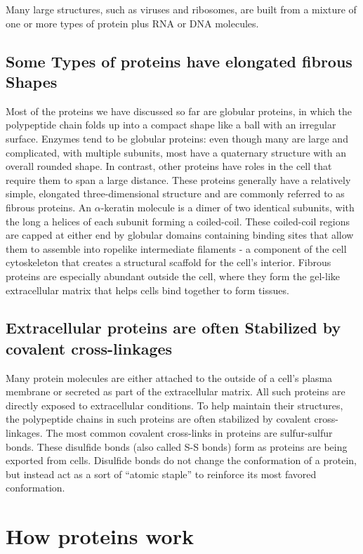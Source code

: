 Many large structures, such as viruses and ribosomes, are built from a
mixture of one or more types of protein plus RNA or DNA molecules.

\subsection{Some Types of proteins have elongated fibrous Shapes}

Most of the proteins we have discussed so far are globular proteins, in
which the polypeptide chain folds up into a compact shape like a ball
with an irregular surface. Enzymes tend to be globular proteins: even
though many are large and complicated, with multiple subunits, most
have a quaternary structure with an overall rounded shape.
In contrast, other proteins have roles in the cell that require them to
span a large distance. These proteins generally have a relatively simple,
elongated three-dimensional structure and are commonly referred to as
fibrous proteins.
An $\alpha$-keratin molecule is a dimer of two identical subunits, with the
long a helices of each subunit forming a coiled-coil.
These coiled-coil regions are capped at either end by globular domains
containing binding sites that allow them to assemble into ropelike intermediate
filaments - a component of the cell cytoskeleton that creates a
structural scaffold for the cell’s interior.
Fibrous proteins are especially abundant outside the cell, where they
form the gel-like extracellular matrix that helps cells bind together to form
tissues.

\subsection{Extracellular proteins are often Stabilized by covalent cross-linkages}

Many protein molecules are either attached to the outside of a cell’s
plasma membrane or secreted as part of the extracellular matrix. All such
proteins are directly exposed to extracellular conditions. To help maintain
their structures, the polypeptide chains in such proteins are often
stabilized by covalent cross-linkages.
The most common covalent cross-links
in proteins are sulfur-sulfur bonds. These disulfide bonds (also called
S-S bonds) form as proteins are being exported from cells.
Disulfide bonds do not change the
conformation of a protein, but instead act as a sort of “atomic staple”
to reinforce its most favored conformation.

\section{How proteins work}

